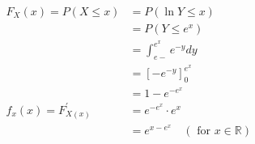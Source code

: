 $\begin{aligned} F_{X}(x)=P(X \leqslant x) &=P(\ln Y \leqslant x) \\ &=P\left(Y \leqslant e^{x}\right) \\ &=\int_{e-}^{e^{x}} e^{-y} d y \\ &=\left[-e^{-y}\right]_{0}^{e^{x}} \\ &=1-e^{-e^{x}} \\ f_{x}(x)=F_{X(x)}^{\prime} &=e^{-e^{x}} \cdot e^{x} \\ &=e^{x-e^{x}} \quad(\text { for } x \in \mathbb{R}) \end{aligned}$